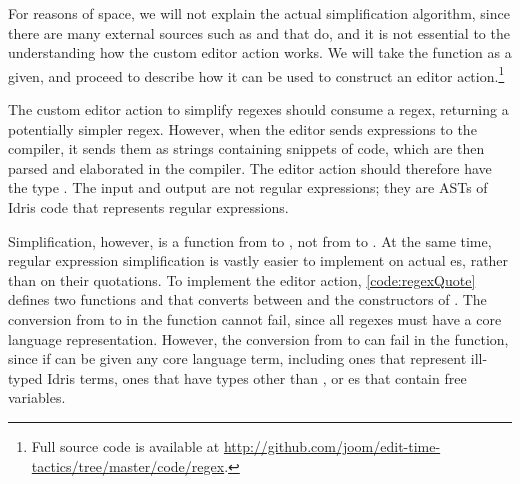 For reasons of space, we will not explain the actual simplification algorithm, since there are
many external sources such as \citet{ortizRegex} and \citet{harperRegex}
 that do, and it is not essential to the understanding how the custom
editor action works.
We will take the function  as a
given, and proceed to describe how it can be used to construct an editor
action.\footnote{Full source code is available at
\url{http://github.com/joom/edit-time-tactics/tree/master/code/regex}.}

The custom editor action to simplify regexes should consume a regex, returning a
potentially simpler regex. However, when the editor sends expressions to the compiler,
it sends them as strings containing snippets of code, which are then parsed and
elaborated in the compiler.  The editor action should therefore have the type
\mt{\TT{} -> \Elab{} \TT{}}. The input and output are not regular expressions;
they are ASTs of Idris code that represents regular expressions.

Simplification, however, is a function from  to , not from
 to .
At the same time, regular expression simplification is vastly easier to implement
on actual es, rather than on their quotations. 
To implement the editor action, \autoref{code:regexQuote} defines two functions  and 
that converts between \TT{} and the constructors of . The
conversion from  to  in the  function cannot fail,
since all regexes must have a core language representation. However, the
conversion from \TT{} to  can fail in the  function,
since if  can be given any core language term, including ones that
represent ill-typed Idris terms, ones that have types other than , or es
that contain free variables.

